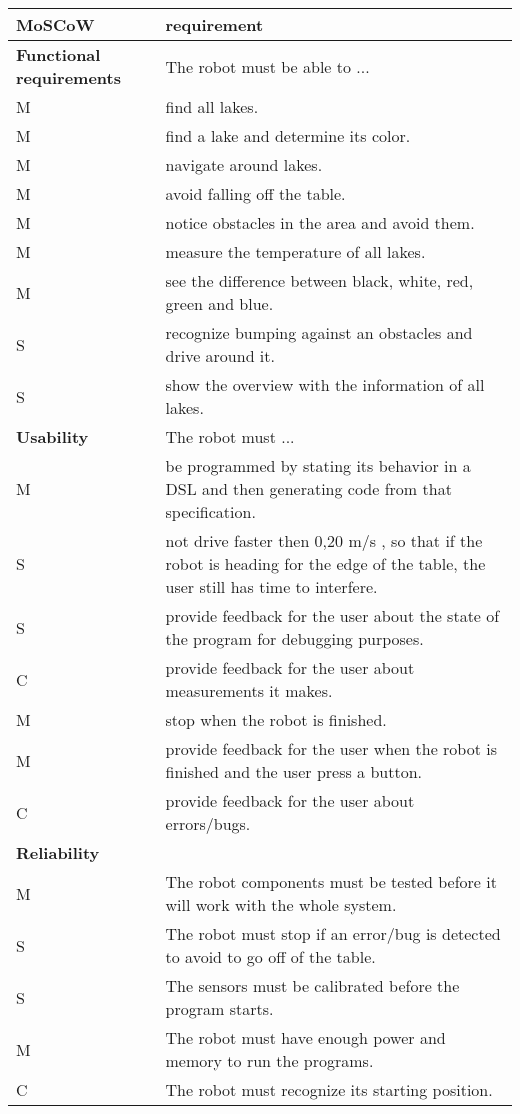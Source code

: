 \documentclass[10pt,a4paper]{article}
\begin{document}
\begin{tabular}{|p{5cm}|p{12cm}|} 
\hline
MoSCoW & requirement\\
\hline
\hline
  \textbf{Functional requirements} & The robot must be able to ...\\
\hline
M & find all lakes.\\
M & find a lake and determine its color.\\
M & navigate around lakes.\\
M & avoid falling off the table.\\
M & notice obstacles in the area and avoid them.\\
M & measure the temperature of all lakes.\\
M & see the difference between black, white, red, green and blue.\\
S & recognize bumping against an obstacles and drive around it.\\
S & show the overview with the information of all lakes.\\
\hline

  \textbf{Usability} & The robot must ...\\
\hline
M & be programmed by stating its behavior in a DSL and then generating code from that specification.\\
S & not drive faster then 0,20 m/s , so that if the robot is heading for the edge of the table, the user still has time to interfere.\\
S & provide feedback for the user about the state of the program for debugging purposes.\\
C & provide feedback for the user about measurements it makes.\\
M & stop when the robot is finished.\\
M & provide feedback for the user when the robot is finished and the user press a button.\\
C & provide feedback for the user about errors/bugs.\\
\hline

  \textbf{Reliability}& \\
\hline
M & The robot components must be tested before it will work with the whole system.\\
S & The robot must stop if an error/bug is detected to avoid to go off of the table. \\
S & The sensors must be calibrated before the program starts.\\
M & The robot must have enough power and memory to run the programs.\\
C & The robot must recognize its starting position.\\


\end{tabular}
\end{document}
